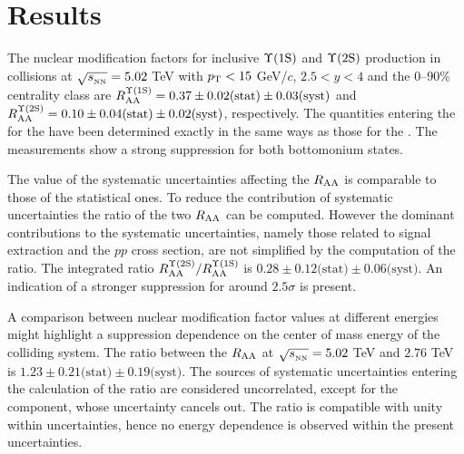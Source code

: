 
\section{Results}\label{section:results}

The nuclear modification factors for  inclusive $\mbox{$\Upsilon$(1S)}$ and $\mbox{$\Upsilon$(2S)}$ production in \pbpb collisions at $\sqrt{s_{_{\rm NN}}}=5.02$ \rm{TeV} with $p_{\rm T} < 15$ GeV/$c$, $2.5 < y < 4$ and the 0--90\% centrality class are $R_{\rm{AA}}^{\Upsilon(\rm1S)}=0.37\pm0.02\text{(stat)}\pm0.03\text{(syst)}$  and $R_{\rm{AA}}^{\Upsilon(\rm2S)}=0.10\pm{0.04}\text{(stat)}\pm{0.02}\text{(syst)}$, respectively.
The quantities entering the \raa for the \upsiss have been determined exactly in the same ways as those for the \upsis.
The measurements show a strong suppression for both bottomonium states.

The value of the systematic uncertainties affecting the $R_{\rm{AA}}$ is comparable to those of the statistical ones.
To reduce the contribution of systematic uncertainties the ratio of the two $R_{\rm{AA}}$ can be computed.
However the dominant contributions to the systematic uncertainties, namely those related to signal extraction and the $pp$ cross section, are not simplified by the computation of the ratio.
The integrated ratio $R_{\rm{AA}}^{\Upsilon(\rm2S)}/R_{\rm{AA}}^{\Upsilon(\rm1S)}$ is $0.28\pm0.12\text{(stat)}\pm0.06\text{(syst)}$. 
An indication of a stronger suppression for \upsiss around $2.5\sigma$ is present.

A comparison between \upsis nuclear modification factor values at different energies might highlight a suppression dependence on the center of mass energy of the colliding system.
The ratio between the \upsis $\mbox{$R_{\rm{AA}}$}$ at $\sqrt{s_{_{\rm NN}}}=5.02$ \rm{TeV} and $2.76$ \rm{TeV} is $1.23\pm0.21\text{(stat)}\pm0.19\text{(syst)}$. 
The sources of systematic uncertainties entering the calculation of the ratio are considered uncorrelated, except for the \taa component, whose uncertainty cancels out. 
The ratio is compatible with unity within uncertainties, hence no energy dependence is observed within the present uncertainties.

